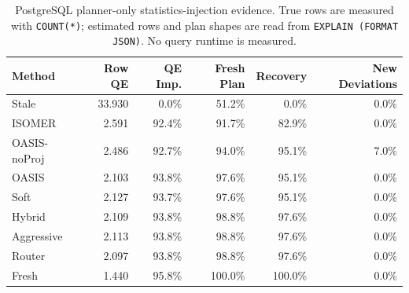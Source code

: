 \begin{table}[t]
  \centering
  \small
  \caption{PostgreSQL planner-only statistics-injection evidence. True rows are measured with \texttt{COUNT(*)}; estimated rows and plan shapes are read from \texttt{EXPLAIN (FORMAT JSON)}. No query runtime is measured.}
  \label{tab:postgres_planner_stats_injection}
  \setlength{\tabcolsep}{4pt}
  \begin{tabular}{lrrrrr}
    \toprule
    Method & Row QE & QE Imp. & Fresh Plan & Recovery & New Deviations \\
    \midrule
    Stale & 33.930 & 0.0\% & 51.2\% & 0.0\% & 0.0\% \\
    ISOMER & 2.591 & 92.4\% & 91.7\% & 82.9\% & 0.0\% \\
    OASIS-noProj & 2.486 & 92.7\% & 94.0\% & 95.1\% & 7.0\% \\
    OASIS & 2.103 & 93.8\% & 97.6\% & 95.1\% & 0.0\% \\
    Soft & 2.127 & 93.7\% & 97.6\% & 95.1\% & 0.0\% \\
    Hybrid & 2.109 & 93.8\% & 98.8\% & 97.6\% & 0.0\% \\
    Aggressive & 2.113 & 93.8\% & 98.8\% & 97.6\% & 0.0\% \\
    Router & 2.097 & 93.8\% & 98.8\% & 97.6\% & 0.0\% \\
    Fresh & 1.440 & 95.8\% & 100.0\% & 100.0\% & 0.0\% \\
    \bottomrule
  \end{tabular}
\end{table}
